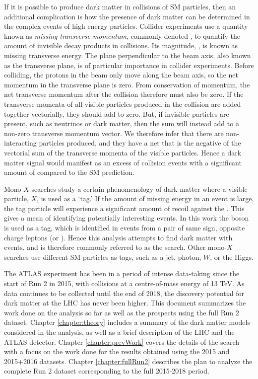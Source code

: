 If it is possible to produce dark matter in collisions of SM particles, then an additional complication is how the presence of dark matter can be determined in the complex events of high energy particles. Collider experiments use a quantity known as \textit{missing transverse momentum}, commonly denoted \etmissvec, to quantify the amount of invisible decay products in collisions. Its magnitude, \etmiss, is known as missing transverse energy. The plane perpendicular to the beam axis, also known as the transverse plane, is of particular importance in collider experiments. Before colliding, the protons in the beam only move along the beam axis, so the net momentum in the transverse plane is zero. From conservation of momentum, the net transverse momentum after the collision therefore must also be zero. If the transverse momenta of all visible particles produced in the collision are added together vectorially, they should add to zero. But, if invisible particles are present, such as neutrinos or dark matter, then the sum will instead add to a non-zero transverse momentum vector. We therefore infer that there are non-interacting particles produced, and they have a net \etmissvec that is the negative of the vectorial sum of the transverse momenta of the visible particles. Hence a dark matter signal would manifest as an excess of collision events with a significant amount of \etmiss compared to the SM prediction.

Mono-$X$ searches study a certain phenomenology of dark matter where a visible particle, $X$, is used as a `tag.' If the amount of missing energy in an event is large, the tag particle will experience a significant amount of recoil against the \etmissvec. This gives a mean of identifying potentially interesting events. In this work the \Z boson is used as a tag, which is identified in events from a pair of same sign, opposite charge leptons (\epem or \mpmm). Hence this analysis attempts to find dark matter with \Zlletmiss events, and is therefore commonly referred to as the \monoZll search. Other mono-$X$ searches use different SM particles as tags, such as a jet, photon, $W$, or the Higgs.

The ATLAS experiment has been in a period of intense data-taking since the start of Run 2 in 2015, with \pp collisions at a centre-of-mass energy of 13 TeV. As data continues to be collected until the end of 2018, the discovery potential for dark matter at the LHC has never been higher. This document summarizes the work done on the \monoZll analysis so far as well as the prospects using the full Run 2 dataset. Chapter \ref{chapter:theory} includes a summary of the dark matter models considered in the analysis, as well as a brief description of the LHC and the ATLAS detector. Chapter \ref{chapter:prevWork} covers the details of the search with a focus on the work done for the results obtained using the 2015 and 2015+2016 datasets. Chapter \ref{chapter:fullRun2} describes the plan to analyze the complete Run 2 dataset corresponding to the full 2015-2018 period.


